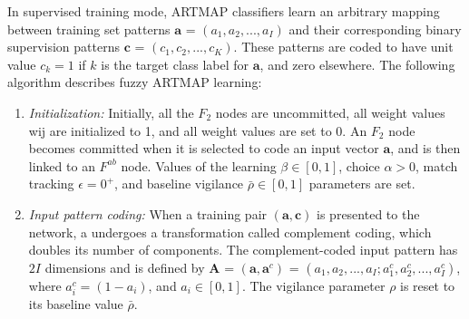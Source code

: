 In supervised training mode, ARTMAP classifiers learn an arbitrary mapping between training set patterns $\textbf{a}$ = $(a_1, a_2, ..., a_I)$ and their corresponding binary supervision patterns $\textbf{c}$ = $(c_1, c_2, ..., c_K)$.
These patterns are coded to have unit value $c_k = 1$ if $k$ is the target class
label for $\textbf{a}$, and zero elsewhere. The following algorithm describes fuzzy ARTMAP learning:
\begin{enumerate}
    \item \emph{Initialization:} Initially, all the $F_2$ nodes are uncommitted, all weight values wij are initialized to 1, and all weight values  are set to 0. An $F_2$ node becomes committed when it is selected to code an input vector $\textbf{a}$, and is then linked to an $F^{ab}$ node. Values of the learning $\beta \in [0,1]$, choice $\alpha>0$, match tracking $\epsilon=0^+$, and baseline vigilance $\bar{\rho} \in [0,1]$ parameters are set.
    \label{step:initialization}

		\item \emph{Input pattern coding:} When a training pair $(\textbf{a}, \textbf{c})$ is presented to the network, a undergoes a transformation called complement coding, which doubles its number of components. The complement-coded input pattern has $2I$ dimensions and is defined by $\textbf{A}$ = $(\textbf{a},\textbf{a}^{c})$ = $(a_1, a_2, ..., a_I; a^c_1, a^c_2, ..., a^c_I)$, where $a^c_i = (1-a_i)$, and $a_i \in [0,1]$. The vigilance parameter $\rho$ is reset to its baseline value $\bar{\rho}$.
		\label{step:coding}


\end{enumerate}
